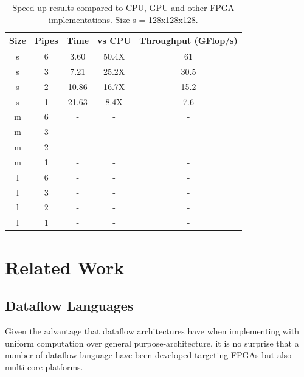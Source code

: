 \begin{table}[!h]
  \centering
  \caption{Speed up results compared to CPU, GPU and other FPGA implementations. Size s = 128x128x128.}
  \label{speedup}
  \begin{tabular}{ ccccc}
    Size & Pipes & Time  & vs CPU & Throughput (GFlop/s) \\ \hline
    s    & 6     & 3.60  & 50.4X  & 61                   \\
    s    & 3     & 7.21  & 25.2X  & 30.5                 \\
    s    & 2     & 10.86 & 16.7X  & 15.2                 \\
    s    & 1     & 21.63 & 8.4X   & 7.6                  \\\hline
    m    & 6     & -     & -      & -                    \\
    m    & 3     & -     & -      & -                    \\
    m    & 2     & -     & -      & -                    \\
    m    & 1     & -     & -      & -                    \\ \hline
    l    & 6     & -     & -      & -                    \\
    l    & 3     & -     & -      & -                    \\
    l    & 2     & -     & -      & -                    \\
    l    & 1     & -     & -      & -                    \\
  \end{tabular}
\end{table}








\section{Related Work}

\subsection{Dataflow Languages}


Given the advantage that dataflow architectures have when implementing with
uniform computation over general purpose-architecture, it is no
surprise that a number of dataflow language have been developed
targeting FPGAs but also multi-core platforms.

